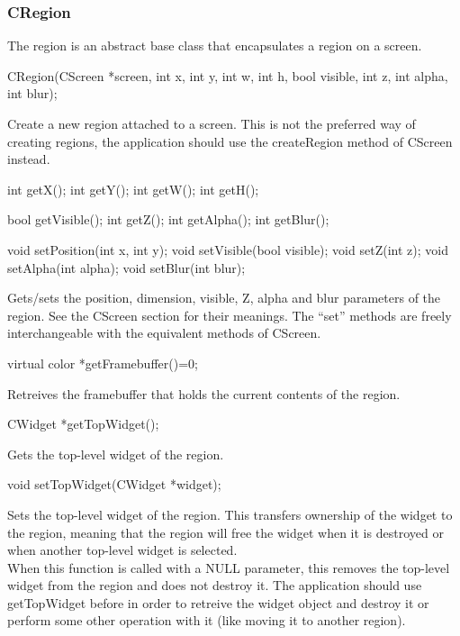 \documentclass[a4paper,11pt]{journal}
\begin{document}
\subsubsection{CRegion}
The region is an abstract base class that encapsulates a region on a screen.\\
\begin{verbatimtab}CRegion(CScreen *screen, int x, int y, int w, int h, bool visible, int z,
int alpha, int blur);\end{verbatimtab}
Create a new region attached to a screen. This is not the preferred way of creating regions, the application should use the createRegion method of CScreen instead.\\
\begin{verbatimtab}
int getX();
int getY();
int getW();
int getH();

bool getVisible();
int getZ();
int getAlpha();
int getBlur();

void setPosition(int x, int y);
void setVisible(bool visible);
void setZ(int z);
void setAlpha(int alpha);
void setBlur(int blur);
\end{verbatimtab}
Gets/sets the position, dimension, visible, Z, alpha and blur parameters of the region. See the CScreen section for their meanings. The ``set'' methods are freely interchangeable with the equivalent methods of CScreen.\\
\begin{verbatimtab}virtual color *getFramebuffer()=0;\end{verbatimtab}
Retreives the framebuffer that holds the current contents of the region.\\
\begin{verbatimtab}CWidget *getTopWidget();\end{verbatimtab}
Gets the top-level widget of the region.\\
\begin{verbatimtab}void setTopWidget(CWidget *widget);\end{verbatimtab}
Sets the top-level widget of the region. This transfers ownership of the widget to the region, meaning that the region will free the widget when it is destroyed or when another top-level widget is selected.\\
When this function is called with a NULL parameter, this removes the top-level widget from the region and does not destroy it. The application should use getTopWidget before in order to retreive the widget object and destroy it or perform some other operation with it (like moving it to another region).
\end{document}

